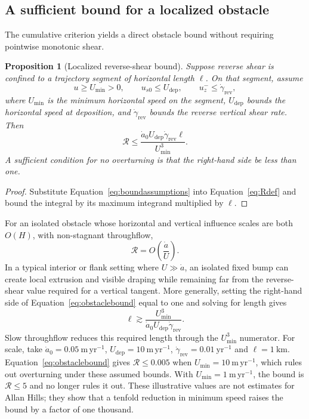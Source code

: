 \documentclass[review]{igs}
\newtheorem{proposition}{Proposition}
\theoremstyle{definition}
\theoremstyle{remark}
\newcommand{\Rneg}{\mathcal{R}}
\begin{document}
\subsection{A sufficient bound for a localized obstacle}

The cumulative criterion yields a direct obstacle bound without requiring pointwise monotonic shear.

\begin{proposition}[Localized reverse-shear bound]
Suppose reverse shear is confined to a trajectory segment of horizontal length \(\ell\). On that segment, assume
\begin{equation}
 u\geq U_{\min}>0,
 \qquad
 u_{s0}\leq U_{\mathrm{dep}},
 \qquad
 u_z^-\leq \dot\gamma_{\mathrm{rev}},
\label{eq:boundassumptions}
\end{equation}
where \(U_{\min}\) is the minimum horizontal speed on the segment, \(U_{\mathrm{dep}}\) bounds the horizontal speed at deposition, and \(\dot\gamma_{\mathrm{rev}}\) bounds the reverse vertical shear rate. Then
\begin{equation}
\boxed{
\Rneg\leq
\frac{\dot a_0U_{\mathrm{dep}}\dot\gamma_{\mathrm{rev}}\ell}
{U_{\min}^{3}}.
}
\label{eq:obstaclebound}
\end{equation}
A sufficient condition for no overturning is that the right-hand side be less than one.
\end{proposition}

\begin{proof}
Substitute Equation~\eqref{eq:boundassumptions} into Equation~\eqref{eq:Rdef} and bound the integral by its maximum integrand multiplied by \(\ell\).
\end{proof}

For an isolated obstacle whose horizontal and vertical influence scales are both \(O(H)\), with non-stagnant throughflow,
\begin{equation}
\Rneg=O\left(\frac{\dot a}{U}\right).
\label{eq:isolatedscale}
\end{equation}
In a typical interior or flank setting where \(U\gg\dot a\), an isolated fixed bump can create local extrusion and visible draping while remaining far from the reverse-shear value required for a vertical tangent. More generally, setting the right-hand side of Equation~\eqref{eq:obstaclebound} equal to one and solving for length gives
\begin{equation}
\ell
\gtrsim
\frac{U_{\min}^{3}}
{\dot a_0U_{\mathrm{dep}}\dot\gamma_{\mathrm{rev}}}.
\label{eq:lengththreshold}
\end{equation}
Slow throughflow reduces this required length through the \(U_{\min}^{3}\) numerator. For scale, take \(\dot a_0=0.05~\mathrm{m\,yr^{-1}}\), \(U_{\mathrm{dep}}=10~\mathrm{m\,yr^{-1}}\), \(\dot\gamma_{\mathrm{rev}}=0.01~\mathrm{yr^{-1}}\) and \(\ell=1~\mathrm{km}\). Equation~\eqref{eq:obstaclebound} gives \(\Rneg\leq0.005\) when \(U_{\min}=10~\mathrm{m\,yr^{-1}}\), which rules out overturning under these assumed bounds. With \(U_{\min}=1~\mathrm{m\,yr^{-1}}\), the bound is \(\Rneg\leq5\) and no longer rules it out. These illustrative values are not estimates for Allan Hills; they show that a tenfold reduction in minimum speed raises the bound by a factor of one thousand.
\end{document}
